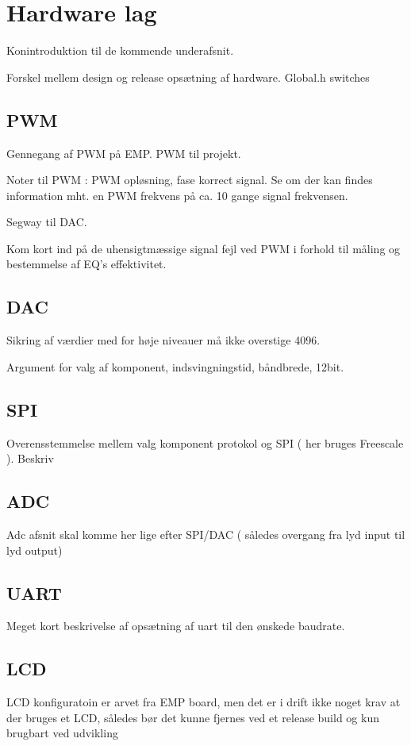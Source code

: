 \section{Hardware lag}
Konintroduktion til de kommende underafsnit.

Forskel mellem design og release opsætning af hardware.
Global.h switches

\subsection{PWM}
Gennegang af PWM på EMP.
PWM til projekt.

Noter til PWM : PWM opløsning, fase korrect signal. Se om der kan findes information mht. en PWM frekvens på ca. 10 gange signal frekvensen.


Segway til DAC.

Kom kort ind på de uhensigtmæssige signal fejl ved PWM i forhold til måling og bestemmelse af EQ's effektivitet.

\subsection{DAC}

Sikring af værdier med for høje niveauer må ikke overstige 4096.

Argument for valg af komponent, indsvingningstid, båndbrede, 12bit.

\subsection{SPI}

Overensstemmelse mellem valg komponent protokol og SPI ( her bruges Freescale ).
Beskriv 

\subsection{ADC}

Adc afsnit skal komme her lige efter SPI/DAC ( således overgang fra lyd input til lyd output)


\subsection{UART}
Meget kort beskrivelse af opsætning af uart til den ønskede baudrate.

\subsection{LCD}
LCD konfiguratoin er arvet fra EMP board, men det er i drift ikke noget krav at der bruges et LCD, således bør det kunne fjernes ved et release build og kun brugbart ved udvikling

